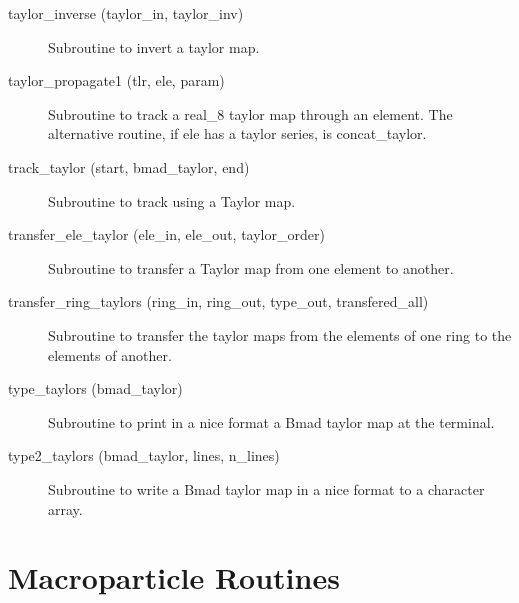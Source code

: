 \begin{description}
\item[taylor\_inverse (taylor\_in, taylor\_inv)] \Newline
Subroutine to invert a taylor map. 

\item[taylor\_propagate1 (tlr, ele, param)] \Newline
Subroutine to track a real\_8 taylor map through an element. 
The alternative routine, if ele has a taylor series, is concat\_taylor. 

\item[track\_taylor (start, bmad\_taylor, end)] \Newline
Subroutine to track using a Taylor map. 

\item[transfer\_ele\_taylor (ele\_in, ele\_out, taylor\_order)] \Newline 
Subroutine to transfer a Taylor map from one element to another.

\item[transfer\_ring\_taylors (ring\_in, ring\_out, 
                                             type\_out, transfered\_all) ] \Newline 
Subroutine to transfer the taylor maps from the elements of one ring to
the elements of another. 

\item[type\_taylors (bmad\_taylor)] \Newline
Subroutine to print in a nice format a Bmad taylor map at the terminal. 

\item[type2\_taylors (bmad\_taylor, lines, n\_lines)] \Newline
Subroutine to write a Bmad taylor map in a nice format to a character array. 

\end{description}

\section{Macroparticle Routines}
\label{r:macro}    

